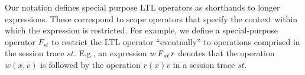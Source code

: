 \documentclass[acmlarge, ,11pt]{acmart}
\begin{document}

 Our notation defines special purpose LTL operators as shorthands to longer expressions. These correspond to scope operators
   that specify the context within which the expression is
  restricted. For example, we define a special-purpose operator $F_\mathit{st}$ to restrict the LTL operator ``eventually'' to operations comprised in the session trace $\mathit{st}$. %
  E.g., an expression ${w} \operatorname{\it F}_\mathit{st} {r}$ denotes that the operation $w(x,v)$ is followed by the operation  $r(x){v}$ in a session trace $\mathit{st}$.
\end{document}
